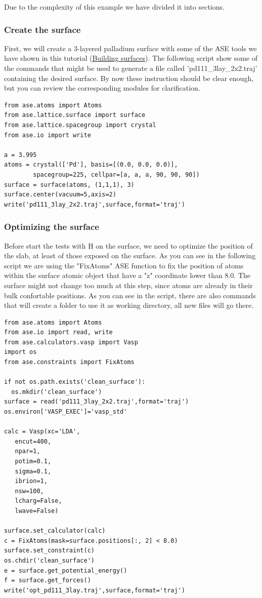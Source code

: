 \documentclass[11pt]{article}
\begin{document}
Due to the complexity of this example we have divided it into sections. 
\subsubsection{Create the surface}
\label{sec:orgde5b319}
First, we will create a 3-layered palladium surface with some of the ASE tools we have shown in this tutorial (\hyperref[sec:org10534d0]{Building surfaces}). The following script show some of the commands that might be used to generate a file called 'pd111\_3lay\_2x2.traj' containing the desired surface. By now these instruction should be clear enough, but you can review the corresponding modules for clarification.

\begin{verbatim}
from ase.atoms import Atoms
from ase.lattice.surface import surface
from ase.lattice.spacegroup import crystal
from ase.io import write

a = 3.995
atoms = crystal(['Pd'], basis=[(0.0, 0.0, 0.0)],
        spacegroup=225, cellpar=[a, a, a, 90, 90, 90])
surface = surface(atoms, (1,1,1), 3)
surface.center(vacuum=5,axis=2)
write('pd111_3lay_2x2.traj',surface,format='traj')
\end{verbatim}

\subsubsection{Optimizing the surface}
\label{sec:orgb65c99a}
Before start the tests with H on the surface, we need to optimize the position of the slab, at least of those exposed on the surface. As you can see in the following script we are using the "FixAtoms" ASE function to fix the position of atoms within the surface atomic object that have a "z" coordinate lower than 8.0. The surface might not change too much at this step, since atoms are already in their bulk confortable positions. As you can see in the script, there are also commands that will create a folder to use it as working directory, all new files will go there.

\begin{verbatim}
from ase.atoms import Atoms
from ase.io import read, write
from ase.calculators.vasp import Vasp
import os
from ase.constraints import FixAtoms

if not os.path.exists('clean_surface'):
  os.mkdir('clean_surface')
surface = read('pd111_3lay_2x2.traj',format='traj')
os.environ['VASP_EXEC']='vasp_std'

calc = Vasp(xc='LDA',
   encut=400,
   npar=1,
   potim=0.1,
   sigma=0.1,
   ibrion=1,
   nsw=100,
   lcharg=False,
   lwave=False)

surface.set_calculator(calc)
c = FixAtoms(mask=surface.positions[:, 2] < 8.0)
surface.set_constraint(c)
os.chdir('clean_surface')
e = surface.get_potential_energy()
f = surface.get_forces()
write('opt_pd111_3lay.traj',surface,format='traj')
\end{verbatim}
\end{document}
